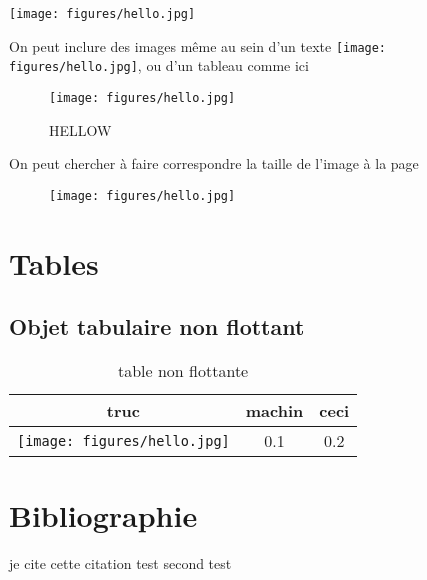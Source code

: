 \documentclass[a4paper, 10pt]{article}
\begin{document}
\begin{multicols}{2}
\texttt{[image: figures/hello.jpg]}

On peut inclure des images même au sein d'un texte \texttt{[image: figures/hello.jpg]}, ou d'un tableau  comme ici


\begin{figure}
\begin{center}
\texttt{[image: figures/hello.jpg]}
\caption{HELLOW} %
\end{center}
\end{figure}
On peut chercher à faire correspondre la taille de l'image à la page

\begin{figure*}
\begin{center}
\texttt{[image: figures/hello.jpg]}
\end{center}
\end{figure*}

\blindtext[10]


\end{multicols}
\newpage

\section{Tables}
\subsection{Objet tabulaire non flottant}
\begin{table}
\begin{tabular}{|c|c|c|}
\hline
truc& machin & ceci\\
\hline
\texttt{[image: figures/hello.jpg]} & 0.1 & 0.2 \\
\hline
\end{tabular}
\caption{table non flottante}
\end{table}















\section{Bibliographie}
je cite cette citation \cite{PMID12643357} %
test \citep{PMID12643357} %
second test  \citet{PMID12643357}



\end{document}
